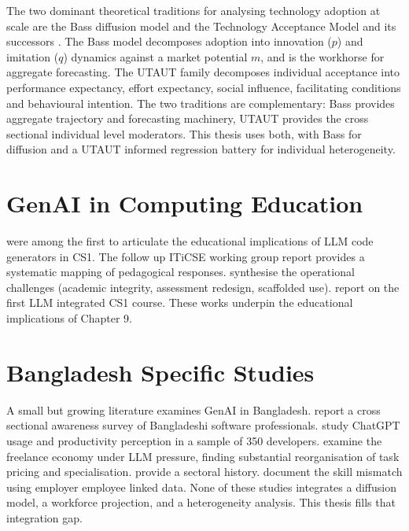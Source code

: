 \documentclass[11pt,a4paper]{report}
\begin{document}
The two dominant theoretical traditions for analysing technology
adoption at scale are the Bass diffusion model
\citep{Bass1969,MahajanMullerBass1990,Rogers2003} and the Technology
Acceptance Model and its successors
\citep{DavisTAM1989,VenkateshUTAUT2003,VenkateshUTAUT22012}. The Bass
model decomposes adoption into innovation ($p$) and imitation ($q$)
dynamics against a market potential $m$, and is the workhorse for
aggregate forecasting. The UTAUT family decomposes individual acceptance
into performance expectancy, effort expectancy, social influence,
facilitating conditions and behavioural intention. The two traditions
are complementary: Bass provides aggregate trajectory and forecasting
machinery, UTAUT provides the cross sectional individual level
moderators. This thesis uses both, with Bass for diffusion and a UTAUT
informed regression battery for individual heterogeneity.

\section{GenAI in Computing Education}

\citet{BeckerDennyPratherEtAl2023} were among the first to articulate
the educational implications of LLM code generators in CS1. The
follow up ITiCSE working group report \citep{PratherEtAl2024} provides
a systematic mapping of pedagogical responses. \citet{DennyEtAl2024}
synthesise the operational challenges (academic integrity, assessment
redesign, scaffolded use). \citet{Vadaparty2025} report on the first
LLM integrated CS1 course. These works underpin the educational
implications of Chapter 9.

\section{Bangladesh Specific Studies}

A small but growing literature examines GenAI in Bangladesh.
\citet{IslamKabir2025} report a cross sectional awareness survey of
Bangladeshi software professionals. \citet{RahmanSarker2024} study
ChatGPT usage and productivity perception in a sample of 350 developers.
\citet{KaramSiddiqueAlam2025} examine the freelance economy under LLM
pressure, finding substantial reorganisation of task pricing and
specialisation. \citet{HossainAhmed2024} provide a sectoral history.
\citet{ChowdhuryRahman2025} document the skill mismatch using employer
employee linked data. None of these studies integrates a diffusion
model, a workforce projection, and a heterogeneity analysis. This thesis
fills that integration gap.
\end{document}
